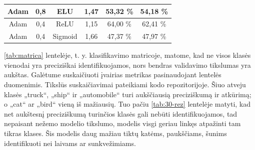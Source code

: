 \documentclass{VUMIFPSbakalaurinis}
\begin{document}
\begin{table}[]
{\begin{tabular}{|c|c|c|c|c|c|}
      Adam                                                                        & 0,8                                                                         & ELU                                                                   & 1,47                                                                         & 53,32 \%                                                           & 54,18 \%                                                              \\ \hline
      Adam                                                                        & 0,4                                                                         & ReLU                                                                  & 1,15                                                                         & 64,00 \%                                                           & 62,41 \%                                                              \\ \hline
      Adam                                                                        & 0,4                                                                         & Sigmoid                                                               & 1,66                                                                         & 47,37 \%                                                           & 47,97 \%                                                              \\ \hline
      \end{tabular}}
  \label{tab:hiperparametrai}
\end{table}




\ref{tab:matrica} lentelėje, t. y. klasifikavimo matricoje, matome, kad ne visos
klasės vienodai yra preciziškai identifikuojamos, nors bendras validavimo tikslumas
yra aukštas. Galėtume suskaičiuoti įvairias metrikas pasinaudojant lentelės duomenimis.
Tikslūs suskaičiavimai pateikiami kodo repozitorijoje.
Šiuo atveju klasės „truck“, „ship“ ir „automobile“ turi aukščiausią
preciziškumą ir atkūrimą; o „cat“ ar „bird“ vieną iš mažiausių. Tuo pačiu
\ref{tab:30-rez} lentelėje matyti, kad net aukštesnį preciziškumą turinčios
klasės gali nebūti identifikuojamos, tad nepaisant nežemo modelio tikslumo,
modelis visgi geriau linkęs atpažinti tam tikras klases. Šis modelis daug mažiau tiktų
katėms, paukščiams, šunims identifikuoti nei laivams ar sunkvežimiams.
\end{document}

